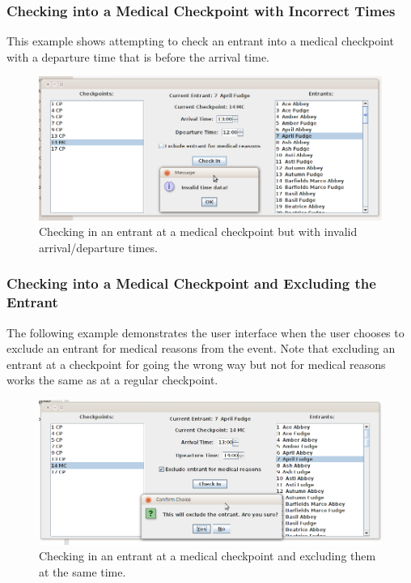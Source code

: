 \documentclass{article}
\begin{document}
\subsubsection{Checking into a Medical Checkpoint with Incorrect Times}
This example shows attempting to check an entrant into a medical checkpoint with a departure time that is before the arrival time.

\begin{figure}[H]
\centering
\includegraphics[width=1\textwidth]{img/GUI-test/mc-invalid-time.png}
\caption{Checking in an entrant at a medical checkpoint but with invalid arrival/departure times.}
\label{fig:mc-invalid-time}
\end{figure}

\subsubsection{Checking into a Medical Checkpoint and Excluding the Entrant}
The following example demonstrates the user interface when the user chooses to exclude an entrant for medical reasons from the event. Note that excluding an entrant at a checkpoint for going the wrong way but not for medical reasons works the same as at a regular checkpoint.

\begin{figure}[H]
\centering
\includegraphics[width=1\textwidth]{img/GUI-test/mc-exclude.png}
\caption{Checking in an entrant at a medical checkpoint and excluding them at the same time.}
\label{fig:mc-exclude}
\end{figure}
\end{document}
